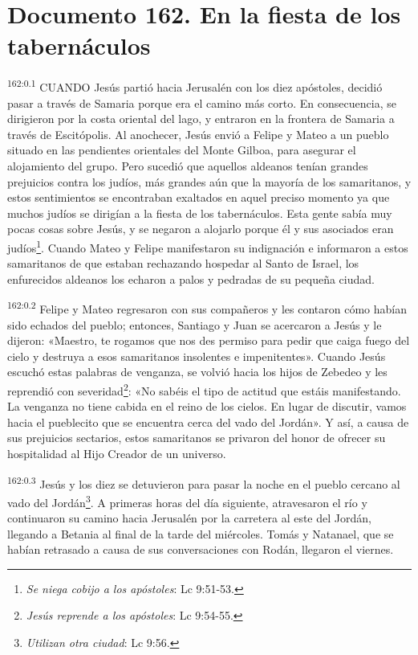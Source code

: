 \chapter{Documento 162. En la fiesta de los tabernáculos}
\par
\textsuperscript{162:0.1} CUANDO Jesús partió hacia Jerusalén con los diez apóstoles, decidió pasar a través de Samaria porque era el camino más corto. En consecuencia, se dirigieron por la costa oriental del lago, y entraron en la frontera de Samaria a través de Escitópolis. Al anochecer, Jesús envió a Felipe y Mateo a un pueblo situado en las pendientes orientales del Monte Gilboa, para asegurar el alojamiento del grupo. Pero sucedió que aquellos aldeanos tenían grandes prejuicios contra los judíos, más grandes aún que la mayoría de los samaritanos, y estos sentimientos se encontraban exaltados en aquel preciso momento ya que muchos judíos se dirigían a la fiesta de los tabernáculos. Esta gente sabía muy pocas cosas sobre Jesús, y se negaron a alojarlo porque él y sus asociados eran judíos\footnote{\textit{Se niega cobijo a los apóstoles}: Lc 9:51-53.}. Cuando Mateo y Felipe manifestaron su indignación e informaron a estos samaritanos de que estaban rechazando hospedar al Santo de Israel, los enfurecidos aldeanos los echaron a palos y pedradas de su pequeña ciudad.

\par
\textsuperscript{162:0.2} Felipe y Mateo regresaron con sus compañeros y les contaron cómo habían sido echados del pueblo; entonces, Santiago y Juan se acercaron a Jesús y le dijeron: «Maestro, te rogamos que nos des permiso para pedir que caiga fuego del cielo y destruya a esos samaritanos insolentes e impenitentes». Cuando Jesús escuchó estas palabras de venganza, se volvió hacia los hijos de Zebedeo y les reprendió con severidad\footnote{\textit{Jesús reprende a los apóstoles}: Lc 9:54-55.}: «No sabéis el tipo de actitud que estáis manifestando. La venganza no tiene cabida en el reino de los cielos. En lugar de discutir, vamos hacia el pueblecito que se encuentra cerca del vado del Jordán». Y así, a causa de sus prejuicios sectarios, estos samaritanos se privaron del honor de ofrecer su hospitalidad al Hijo Creador de un universo.

\par
\textsuperscript{162:0.3} Jesús y los diez se detuvieron para pasar la noche en el pueblo cercano al vado del Jordán\footnote{\textit{Utilizan otra ciudad}: Lc 9:56.}. A primeras horas del día siguiente, atravesaron el río y continuaron su camino hacia Jerusalén por la carretera al este del Jordán, llegando a Betania al final de la tarde del miércoles. Tomás y Natanael, que se habían retrasado a causa de sus conversaciones con Rodán, llegaron el viernes.

